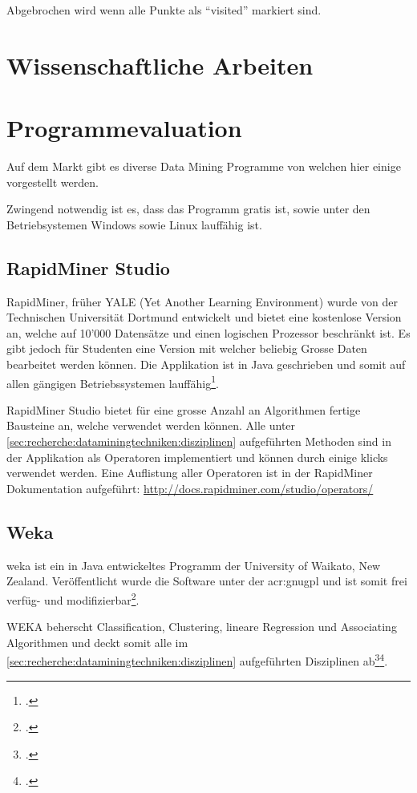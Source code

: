 Abgebrochen wird wenn alle Punkte als "`visited"' markiert sind.

\section{Wissenschaftliche Arbeiten}
\todo{}

\section{Programmevaluation}
\label{sec:recherche:programmevaluation}
Auf dem Markt gibt es diverse Data Mining Programme von welchen hier einige vorgestellt werden.

Zwingend notwendig ist es, dass das Programm gratis ist, sowie unter den Betriebsystemen Windows sowie Linux lauffähig ist. 


\subsection{RapidMiner Studio}
RapidMiner, früher YALE (Yet Another Learning Environment) wurde von der Technischen Universität Dortmund entwickelt und bietet eine kostenlose Version an, welche auf 10'000 Datensätze und einen logischen Prozessor beschränkt ist. Es gibt jedoch für Studenten eine Version mit welcher beliebig Grosse Daten bearbeitet werden können. Die Applikation ist in Java geschrieben und somit auf allen gängigen Betriebssystemen lauffähig\footcite{RapidMiner_Studio_2017-01-14}.

RapidMiner Studio bietet für eine grosse Anzahl an Algorithmen fertige Bausteine an, welche verwendet werden können. Alle unter \cref{sec:recherche:dataminingtechniken:disziplinen} aufgeführten Methoden sind in der Applikation als Operatoren implementiert und können durch einige klicks verwendet werden. Eine Auflistung aller Operatoren ist in der RapidMiner Dokumentation aufgeführt: \url{http://docs.rapidminer.com/studio/operators/}

\subsection{Weka}
\gls{weka} ist ein in Java entwickeltes Programm der University of Waikato, New Zealand. Veröffentlicht wurde die Software unter der \gls{acr:gnugpl} und ist somit frei verfüg- und modifizierbar\footcite{Weka_2017-01-14}.

WEKA beherscht Classification, Clustering, lineare Regression und Associating Algorithmen und deckt somit alle  im \cref{sec:recherche:dataminingtechniken:disziplinen} aufgeführten Disziplinen ab\footcite{Weka_Doc_2017-01-14}\footcite{Weka_Regression_2017-01-14}.

